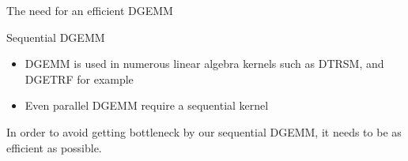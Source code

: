 \begin{frame}{The need for an efficient DGEMM}
    \begin{block}{Sequential DGEMM}
        \begin{itemize}
            \item  DGEMM is used in numerous linear algebra kernels such as DTRSM, and DGETRF for example
            \item Even parallel DGEMM require a sequential kernel
        \end{itemize}
    In order to avoid getting bottleneck by our sequential DGEMM, it needs to be as efficient as possible.
    \end{block}
\end{frame}
